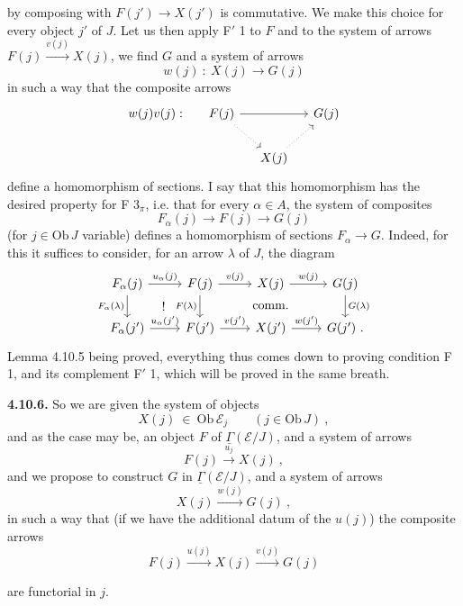 \documentclass[11pt]{article}
\newcommand{\printedpage}[1]{\marginpar{\footnotesize p.~#1}}
\newcommand{\msp}[1]{\marginpar{\footnotesize [#1]}}
\newcommand{\uGamma}{\underline{\Gamma}}
\newcommand{\Ob}{\mathrm{Ob}\,}
\begin{document}
\msp{253}
by composing with $F(j')\longrightarrow X(j')$ is commutative. We make this choice for every object $j'$ of $J$. Let us then apply F$'$ 1 to $F$ and to the system of arrows $F(j)\xrightarrow{v(j)}X(j)$, we find $G$ and a system of arrows
\[
w(j)\ :\ X(j) \longrightarrow G(j)
\]
in such a way that the composite arrows
\[
\begin{tikzcd}[column sep=small]
w(j)v(j) : & F(j) \arrow[rr] \arrow[dr,dotted] & & G(j) \\
& & X(j) \arrow[ur,dotted] &
\end{tikzcd}
\]
define a homomorphism of sections. I say that this homomorphism has the desired property for F $3_\pi$, i.e. that for every $\alpha\in A$, the system of composites
\[
F_\alpha(j) \longrightarrow F(j) \longrightarrow G(j)
\]
(for $j\in\Ob J$ variable) defines a homomorphism of sections $F_\alpha\longrightarrow G$. Indeed, for this it suffices to consider, for an arrow $\lambda$ of $J$, the
\printedpage{96}
\msp{254}
diagram
\[
\begin{tikzcd}
F_\alpha(j) \arrow[r,"u_\alpha(j)"] \arrow[d,"F_\alpha(\lambda)"'] \arrow[dr,phantom,"!"] & F(j) \arrow[r,"v(j)"] \arrow[d,"F(\lambda)"'] & X(j) \arrow[r,"w(j)"] \arrow[d,phantom,"\text{comm.}"] & G(j) \arrow[d,"G(\lambda)"] \\
F_\alpha(j') \arrow[r,"u_\alpha(j')"] & F(j') \arrow[r,"v(j')"] & X(j') \arrow[r,"w(j')"] & G(j')\ .
\end{tikzcd}
\]
Lemma 4.10.5 being proved, everything thus comes down to proving condition F 1, and its complement F$'$ 1, which will be proved in the same breath.

\textbf{4.10.6.} So we are given the system of objects
\[
X(j)\ \in\ \Ob\mathcal{E}_j \qquad (j\in\Ob J)\ , \tag*{(4.10.6.1)}
\]
and as the case may be, an object $F$ of $\uGamma(\mathcal{E}/J)$, and a system of arrows
\[
F(j) \xrightarrow{u_j} X(j)\ , \tag*{(4.6.10.2)} %
\]
and we propose to construct $G$ in $\uGamma(\mathcal{E}/J)$, and a system of arrows
\[
X(j) \xrightarrow{w(j)} G(j)\ , \tag*{(4.10.6.3)}
\]
in such a way that (if we have the additional datum of the $u(j)$) the composite arrows
\[
F(j) \xrightarrow{u(j)} X(j) \xrightarrow{v(j)} G(j) %
\]

\msp{255}
are functorial in $j$.
\end{document}
